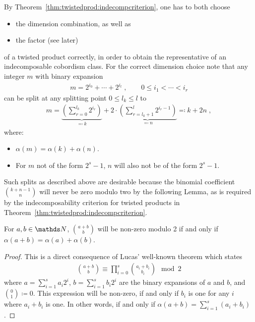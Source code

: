 \begin{Rem}\label{rem:splitdim}
  By Theorem~\ref{thm:twistedprod:indecompcriterion}, one has to
  both choose
  \begin{itemize}
  \item the dimension combination, as well as
  \item the factor (see later)
  \end{itemize}
  of a twisted product correctly, in order to obtain the representative
  of an indecomposable cobordism class.
  For the correct dimension choice note that any integer $m$ with
  binary expansion
  \begin{gather*}
    m=2^{i_0}+\dotsb+2^{i_l}
    \;,\qquad
    0 \leq i_1<\dotsb<i_r
  \end{gather*}
  can be split at any splitting point $0\leq l_k\leq l$ to
  \begin{gather*}
    m = \underbrace{\left(
        \sum_{r=0}^{l_k} 2^{i_r}
      \right)}_{\eqqcolon k}
    + 2\cdot\underbrace{\left(
        \sum_{r=l_k+1}^l 2^{i_r-1}
      \right)}_{\eqqcolon n}
    \eqqcolon k+2n
    \;,
  \end{gather*}
  where:
  \begin{itemize}
  \item $\alpha(m)=\alpha(k)+\alpha(n)$.
  \item For $m$ not of the form $2^s-1$, $n$ will also not be of the
    form $2^s-1$.
  \end{itemize}
\end{Rem}
Such splits as described above are desirable because the binomial
coefficient $\binom{k+n-1}{n}$ will never be zero modulo two by the
following Lemma, 
as is required by the indecomposability criterion for twisted products
in Theorem~\ref{thm:twistedprod:indecompcriterion}.
\begin{Lem}\label{lem:lucas}
  For $a,b\in\Nat$, $\binom{a+b}{b}$ will be non-zero modulo 2 if and only
  if $\alpha(a+b)=\alpha(a)+\alpha(b)$.
  \begin{proof}
    This is a direct consequence of Lucas' well-known theorem
    which states
    \begin{gather*}
      \binom{a+b}{b} \equiv \prod_{i=0}^s \binom{a_i+b_i}{b_i} \mod 2
    \end{gather*}
    where $a=\sum_{i=1}^s a_i2^{i}$, $b=\sum_{i=1}^s b_i2^{i}$ are the
    binary expansions of $a$ and $b$, and $\binom{0}{1}\coloneqq 0$.
    This expression will be non-zero, if and only if $b_i$ is one for
    any $i$ where $a_i+b_i$ is one. In other words, if and only if
    $\alpha(a+b)=\sum_{i=1}^s(a_i+b_i)$.    
  \end{proof}
\end{Lem}

